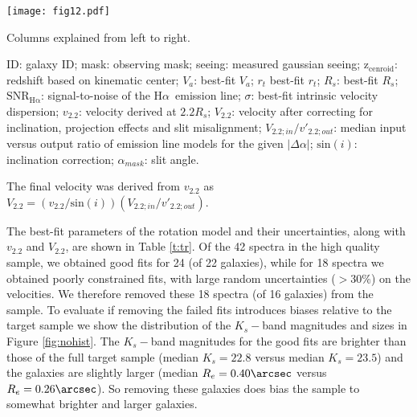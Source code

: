 \documentclass{emulateapj}
\newcommand{\ha}{H$\alpha$}
\newcommand{\tf}{Tully-Fisher}
\begin{document}
\begin{figure*}
\begin{center}
\texttt{[image: fig12.pdf]}
\caption{$K_s$-band magnitude and effective F160W radius $R_e$ stacked histograms of {38} galaxies in the high quality sample. For {18} spectra of {16} galaxies the fits were poorly constrained {or could not be fit with an exponential brightness profile}. The remaining {22} galaxies were used to derive the \tf\ relation. The removed galaxies have fainter $K_s$-band magnitudes and smaller sizes on average, which resulted in a selection bias towards larger and/or brighter galaxies.}
\label{fig:nohist}
\end{center}
\end{figure*}

\begin{table*}
\begin{center}
\caption{Results}
\begin{scriptsize}
\begin{threeparttable}

\begin{tablenotes}
\item {Columns explained from left to right.}
\item {ID: galaxy ID; mask: observing mask; seeing: measured gaussian seeing; $\mathrm{z_{cenroid}}$: redshift based on kinematic center; $V_a$: best-fit $V_a$; $r_t$ best-fit $r_t$; $R_s$: best-fit $R_s$; $\mathrm{SNR_{H\alpha}}$: signal-to-noise of the \ha\ emission line; $\sigma$: best-fit intrinsic velocity dispersion; $v_{2.2}$: velocity derived at $2.2R_s$; $V_{2.2}$: velocity after correcting for inclination, projection effects and slit misalignment; $V_{2.2;in}/v'_{2.2;out}$: median input versus output ratio of emission line models for the given $|\Delta \alpha|$; $\mathrm{sin}(i)$: inclination correction; $\alpha_{mask}$: slit angle.}
\item {The final velocity was derived from $v_{2.2}$ as $V_{2.2}=(v_{2.2}/\mathrm{sin}(i))(V_{2.2;in}/v'_{2.2;out})$.}
\end{tablenotes}
\end{threeparttable}
\end{scriptsize}
\label{t:tr}
\end{center}
\end{table*}

The best-fit parameters of the rotation model and their uncertainties, along with $v_{2.2}$ and $V_{2.2}$, are shown in Table \ref{t:tr}. Of the {42} spectra in the high quality sample, we obtained good fits for 24 (of 22 galaxies), while for {18} spectra we obtained poorly constrained fits{, with large random uncertainties ($>30\%$) on the velocities}. We therefore removed these {18} spectra (of {16} galaxies) from the sample. To evaluate if removing the failed fits introduces biases relative to the target sample we show the distribution of the $K_s-$band magnitudes and sizes in Figure \ref{fig:nohist}. The $K_s-$band magnitudes for the good fits are brighter than those of the full target sample (median {$K_s= 22.8$} versus median {$K_s=23.5$}) and the galaxies are slightly larger (median {$R_e= 0.40\arcsec$} versus {$R_e= 0.26\arcsec$}). So removing these galaxies does bias the sample to somewhat brighter and larger galaxies. 
\end{document}
